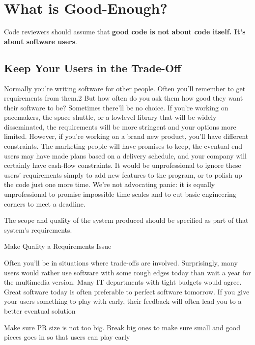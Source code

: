
\chapter{What is Good-Enough?}

Code reviewers should assume that \textbf{good code is not about code itself. It's about software users}.

\section{Keep Your Users in the Trade-Off}

Normally you're writing software for other people. Often you'll remember to get requirements from them.2 But how often do you ask them how good they want their software to be? Sometimes there'll be no choice. If you're working on pacemakers, the space shuttle, or a lowlevel library that will be widely disseminated, the requirements will be more stringent and your options more limited. However, if you're working on a brand new product, you'll have different constraints. The marketing people will have promises to keep, the eventual end users may have made plans based on a delivery schedule, and your company will certainly have cash-flow constraints. It would be unprofessional to ignore these users' requirements simply to add new features to the program, or to polish up the code just one more time. We're not advocating panic: it is equally unprofessional to promise impossible time scales and to cut basic engineering corners to meet a deadline.

The scope and quality of the system produced should be specified as part of that system's requirements.

\begin{marker}
    Make Quality a Requirements Issue
\end{marker}

Often you'll be in situations where trade-offs are involved. Surprisingly, many users would rather use software with some rough edges today than wait a year for the multimedia version. Many IT departments with tight budgets would agree. Great software today is often preferable to perfect software tomorrow. If you give your users something to play with early, their feedback will often lead you to a better eventual solution

\begin{marker}
    Make sure PR size is not too big. Break big ones to make sure small and good pieces goes in so that users can play early
\end{marker}